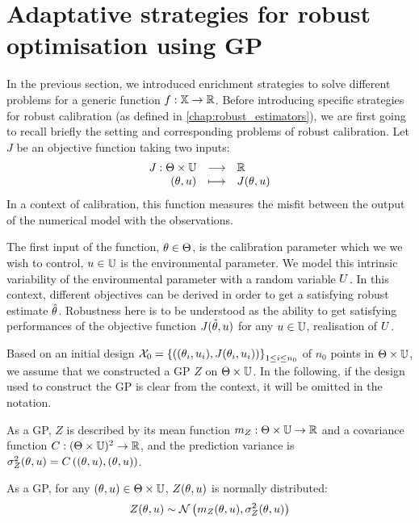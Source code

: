 \documentclass[../../Main_ManuscritThese.tex]{subfiles}
\begin{document}
\section{Adaptative strategies for robust optimisation using GP}
\label{sec:robust_criteria_gp}
In the previous section, we introduced enrichment strategies to solve
different problems for a generic function
$f:\mathbb{X}\rightarrow \mathbb{R}$.  Before introducing specific
strategies for robust calibration (as defined in
\cref{chap:robust_estimators}), we are first going to recall briefly
the setting and corresponding problems of robust calibration.  Let $J$
be an objective function taking two inputs:
\begin{equation}
  \begin{array}{rcl}
    J: \Theta \times \mathbb{U}& \longrightarrow& \mathbb{R} \\
    (\theta, u) & \longmapsto & J(\theta, u)
  \end{array}
\end{equation}
In a context of calibration, this function measures the misfit between the output of the numerical model with the observations.

The first input of the function, $\theta\in\Theta$, is the calibration
parameter which we we wish to control, $u\in\mathbb{U}$ is the
environmental parameter. We model this intrinsic variability of the
environmental parameter with a random variable $U$.  In this
context, different objectives can be derived in order to get a
satisfying robust estimate $\hat{\theta}$. Robustness here is to be understood as
the ability to get satisfying performances of the objective function
$J(\hat{\theta},u)$ for any $u\in\mathbb{U}$, realisation of $U$.

Based on an initial design
$\mathcal{X}_0 = \left\{\left((\theta_i,u_i),J(\theta_i, u_i)
  \right)\right\}_{1\leq i \leq n_0}$ of $n_0$ points in
$\Theta\times\mathbb{U}$, we assume that we constructed a GP $Z$ on
$\Theta \times \mathbb{U}$. In the following, if the design used to
construct the GP is clear from the context, it will be omitted in the
notation.

As a GP, $Z$ is described by its mean function
$m_{Z}:\Theta \times \mathbb{U}\rightarrow\mathbb{R}$ and a covariance
function $C:(\Theta\times\mathbb{U})^2\rightarrow \mathbb{R}$, and the
prediction variance is
$\sigma^2_Z(\theta,u) = C\left((\theta,u), (\theta,u)\right)$.

As a GP, for any $(\theta, u)\in\Theta\times\mathbb{U}$, $Z(\theta, u)$ is normally distributed:
\begin{equation}
  Z(\theta,u) \sim \mathcal{N}\left(m_{Z}(\theta,u), \sigma^2_Z(\theta,u) \right)
\end{equation}
\end{document}
